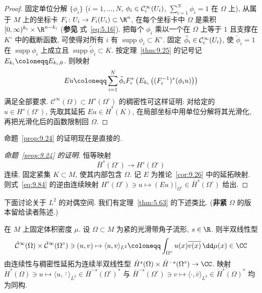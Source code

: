 \begin{proof}
固定单位分解 $\{\phi_i\}$ ($i = 1, \ldots, N$, $\phi_i \in \mathcal{C}_{\mathrm{c}}^\infty(U_i)$, $\sum_{i=1}^{N} \phi_i = 1$ 在 $\Omega$ 上), 从属于 $M$ 上的坐标卡 $F_i \colon U_i \to F_i(U_i) \subset \R^n$, 在每个坐标卡中 $\Omega$ 是乘积 $[0, \infty)^{k_i} \times \R^{n-k_i}$ (\textbf{参见} 式~\eqref{eq:5.16}). 把每个 $\phi_i$ 乘以一个在 $\Omega$ 上等于 $1$ 且支撑在 $K^\circ$ 中的截断函数, 可使得对所有 $i$ 有 $\operatorname{supp} \phi_i \subset K^\circ$. 固定 $\tilde{\phi}_i \in \mathcal{C}_{\mathrm{c}}^\infty(U_i)$, 使 $\tilde{\phi}_i = 1$ 在 $\operatorname{supp} \phi_i$ 上成立且 $\operatorname{supp} \tilde{\phi}_i \subset K$. 按定理~\ref{thm:9.25} 的记号记 $E_{k_i} \defeq E_{k_i, 0}$. 则映射
\begin{equation}\label{eq:9.83}
    E u \defeq \sum_{i=1}^{N} \tilde{\phi}_i F_i^*\left( E_{k_i}\left( (F_i^{-1})^*(\phi_i u) \right) \right)
\end{equation}
满足全部要求. $\mathcal{C}^\infty(\Omega) \subset H^s(\Omega^\circ)$ 的稠密性可这样证明: 对给定的 $u \in H^s(\Omega^\circ)$, 先取其延拓 $Eu \in \dot{H}^s(K)$, 在局部坐标中用单位分解将其光滑化, 再把光滑化后的函数限制回 $\Omega$.
\end{proof}

命题~\ref{prop:9.24} 的证明现在是直接的.

\begin{proof}[命题~\ref{prop:9.24} 的证明]
恒等映射
\begin{equation}\label{eq:9.84}
    \bar{H}^s(\Omega^\circ) \to H^s(\Omega^\circ)
\end{equation}
连续. 固定紧集 $K \subset M$, 使其内部包含 $\Omega$. 记 $E$ 为推论~\ref{cor:9.26} 中的延拓映射. 则式~\eqref{eq:9.84} 的逆由连续映射 $H^s(\Omega^\circ) \ni u \mapsto (Eu)|_{\Omega^\circ} \in \bar{H}^s(\Omega^\circ)$ 给出.
\end{proof}

下面讨论关于 $L^2$ 的对偶空间. 我们有定理~\ref{thm:5.63} 的下述类比. (\textbf{非紧} $\Omega$ 的版本留给读者陈述.)

\begin{theorem}[对偶空间]\label{thm:9.27}
在 $M$ 上固定体积密度 $\mu$. 设 $\Omega \subset M$ 为紧的光滑带角子流形, $s \in \R$. 则半双线性型
\begin{equation}\label{eq:9.85}
    \dot{\mathcal{C}}^\infty(\Omega) \times \bar{\mathcal{C}}^\infty(\Omega^\circ) \ni (u, v) \mapsto \langle u, v \rangle_{L^2} \defeq \int_{\Omega^\circ} u(x) \overline{v(x)} \, \dd \mu(x) \in \CC
\end{equation}
由连续性与稠密性延拓为连续半双线性型 $\dot{H}^s(\Omega) \times \bar{H}^{-s}(\Omega^\circ) \to \CC$. 映射 $\dot{H}^s(\Omega) \ni u \mapsto \langle u, \bar{\cdot}\rangle_{L^2} \in \bar{H}^{-s}(\Omega^\circ)^*$ 与 $\bar{H}^{-s}(\Omega^\circ) \ni v \mapsto \langle \cdot, \bar{v}\rangle_{L^2} \in \dot{H}^s(\Omega)^*$ 均为同构.
\end{theorem}

